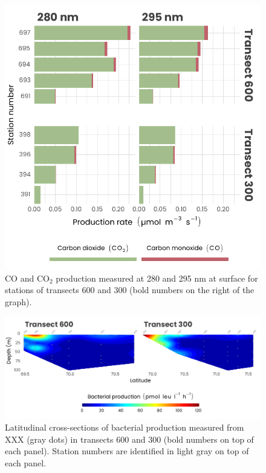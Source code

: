 \documentclass[essd, manuscript]{copernicus}
\begin{document}
\begin{figure}[H]
	\centering
	\includegraphics[scale = 1]{../../../graphs/fig10.pdf}
	\caption{CO and CO$_2$ production measured at 280 and 295 nm at surface for stations of transects 600 and 300 (bold numbers on the right of the graph).}
\end{figure}

\clearpage

\begin{figure}[H]
	\centering
	\includegraphics[scale = 1]{../../../graphs/fig11.pdf}
	\caption{Latitudinal cross-sections of bacterial production measured from XXX (gray dots) in transects 600 and 300 (bold numbers on top of each panel). Station numbers are identified in light gray on top of each panel.}
\end{figure}
\end{document}
